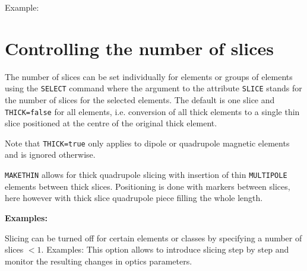 Example:

\section{Controlling the number of slices}
\label{sec:numberofslices}

The number of slices can be set individually for elements or groups of
elements using the \texttt{SELECT} command
where the argument to the attribute \texttt{SLICE} stands for the number of
slices for the selected elements. The default is one slice and
\texttt{THICK=false} for all elements, i.e. conversion of all thick
elements to a single thin slice positioned at the centre of the original
thick element.

Note that \texttt{THICK=true} only applies to dipole or quadrupole magnetic
elements and is ignored otherwise.

\texttt{MAKETHIN} allows for thick quadrupole slicing with insertion of
thin \texttt{MULTIPOLE} elements between thick slices. 
Positioning is done with markers between
slices, here however with thick slice quadrupole piece filling the whole
length.

\textbf{Examples:}

Slicing can be turned off for certain elements or classes by specifying
a number of slices $< 1$. Examples: 
This option allows to introduce slicing step by step and monitor the 
resulting changes in optics parameters.

